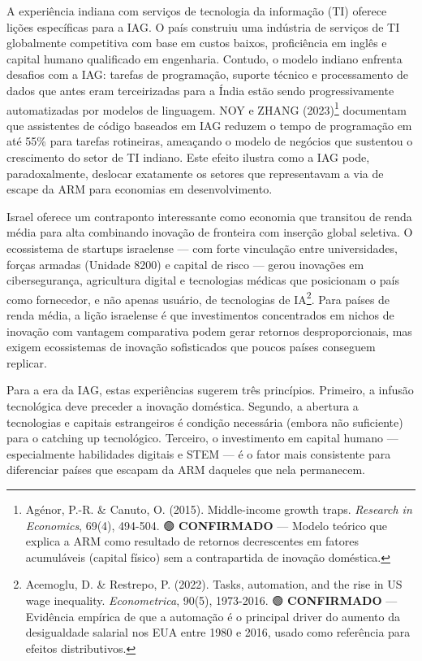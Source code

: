 \documentclass[
  brazilian,
  12pt,
]{article}
\begin{document}
A experiência indiana com serviços de tecnologia da informação (TI) oferece lições específicas para a IAG. O país construiu uma indústria de serviços de TI globalmente competitiva com base em custos baixos, proficiência em inglês e capital humano qualificado em engenharia. Contudo, o modelo indiano enfrenta desafios com a IAG: tarefas de programação, suporte técnico e processamento de dados que antes eram terceirizadas para a Índia estão sendo progressivamente automatizadas por modelos de linguagem. NOY e ZHANG (2023)\footnote{Agénor, P.-R. \& Canuto, O. (2015). Middle-income growth traps. \emph{Research in Economics}, 69(4), 494-504. 🟢 \textbf{CONFIRMADO} --- Modelo teórico que explica a ARM como resultado de retornos decrescentes em fatores acumuláveis (capital físico) sem a contrapartida de inovação doméstica.} documentam que assistentes de código baseados em IAG reduzem o tempo de programação em até 55\% para tarefas rotineiras, ameaçando o modelo de negócios que sustentou o crescimento do setor de TI indiano. Este efeito ilustra como a IAG pode, paradoxalmente, deslocar exatamente os setores que representavam a via de escape da ARM para economias em desenvolvimento.

Israel oferece um contraponto interessante como economia que transitou de renda média para alta combinando inovação de fronteira com inserção global seletiva. O ecossistema de startups israelense --- com forte vinculação entre universidades, forças armadas (Unidade 8200) e capital de risco --- gerou inovações em cibersegurança, agricultura digital e tecnologias médicas que posicionam o país como fornecedor, e não apenas usuário, de tecnologias de IA\footnote{Acemoglu, D. \& Restrepo, P. (2022). Tasks, automation, and the rise in US wage inequality. \emph{Econometrica}, 90(5), 1973-2016. 🟢 \textbf{CONFIRMADO} --- Evidência empírica de que a automação é o principal driver do aumento da desigualdade salarial nos EUA entre 1980 e 2016, usado como referência para efeitos distributivos.}. Para países de renda média, a lição israelense é que investimentos concentrados em nichos de inovação com vantagem comparativa podem gerar retornos desproporcionais, mas exigem ecossistemas de inovação sofisticados que poucos países conseguem replicar.

Para a era da IAG, estas experiências sugerem três princípios. Primeiro, a infusão tecnológica deve preceder a inovação doméstica. Segundo, a abertura a tecnologias e capitais estrangeiros é condição necessária (embora não suficiente) para o catching up tecnológico. Terceiro, o investimento em capital humano --- especialmente habilidades digitais e STEM --- é o fator mais consistente para diferenciar países que escapam da ARM daqueles que nela permanecem.
\end{document}
